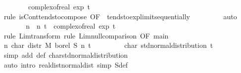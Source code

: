 {\ \ \ \ \ \ \ \ complex{\isacharunderscore}of{\isacharunderscore}real\ {\isacharparenleft}exp\ {\isacharparenleft}{\isacharminus}{\isacharparenleft}t{\isacharcircum}{}{\isacharparenright}\ {\isacharslash}\ {}{\isacharparenright}{\isacharparenright}{\isachardoublequoteclose}\isanewline
\ \ \ \ \ \ \isamarkupfalse%
\ {\isacharparenleft}rule\ isCont{\isacharunderscore}tendsto{\isacharunderscore}compose\ {\isacharbrackleft}OF\ {\isacharunderscore}\ tendsto{\isacharunderscore}exp{\isacharunderscore}limit{\isacharunderscore}sequentially{\isacharbrackright}{\isacharparenright}\isanewline
\ \ \ \ \ \ \ \ \ auto\isanewline
\ \ \ \ \isamarkupfalse%
\ \isamarkupfalse%
\ {\isachardoublequoteopen}{\isacharparenleft}{\isasymlambda}n{\isachardot}\ {\isasymphi}\ n\ t{\isacharparenright}\ {\isasymlonglonglongrightarrow}\ complex{\isacharunderscore}of{\isacharunderscore}real\ {\isacharparenleft}exp\ {\isacharparenleft}{\isacharminus}{\isacharparenleft}t{\isacharcircum}{}{\isacharparenright}\ {\isacharslash}\ {}{\isacharparenright}{\isacharparenright}{\isachardoublequoteclose}\isanewline
\ \ \ \ \ \ \isamarkupfalse%
\ {\isacharparenleft}rule\ Lim{\isacharunderscore}transform{\isacharparenright}\ {\isacharparenleft}rule\ Lim{\isacharunderscore}null{\isacharunderscore}comparison\ {\isacharbrackleft}OF\ main\ {\isacharasterisk}{\isacharbrackright}{\isacharparenright}\isanewline
\ \ \ \ \isamarkupfalse%
\ \isamarkupfalse%
\ {\isachardoublequoteopen}{\isacharparenleft}{\isasymlambda}n{\isachardot}\ char\ {\isacharparenleft}distr\ M\ borel\ {\isacharparenleft}{\isacharquery}S{\isacharprime}\ n{\isacharparenright}{\isacharparenright}\ t{\isacharparenright}\ {\isasymlonglonglongrightarrow}\isanewline
\ \ \ \ \ \ \ \ char\ std{\isacharunderscore}normal{\isacharunderscore}distribution\ t{\isachardoublequoteclose}\isanewline
\ \ \ \ \ \ \isamarkupfalse%
\ {\isacharparenleft}simp\ add{\isacharcolon}\ {\isasymphi}{\isacharunderscore}def\ char{\isacharunderscore}std{\isacharunderscore}normal{\isacharunderscore}distribution{\isacharparenright}\isanewline
\ \ \isamarkupfalse%
\ {\isacharparenleft}auto\ intro{\isacharbang}{\isacharcolon}\ real{\isacharunderscore}dist{\isacharunderscore}normal{\isacharunderscore}dist\ simp{\isacharcolon}\ S{\isacharunderscore}def{\isacharparenright}\isanewline
{}\isamarkupfalse%
%
\endisatagproof
{\isafoldproof}%
%
\isadelimproof
%
\endisadelimproof
%
}%
